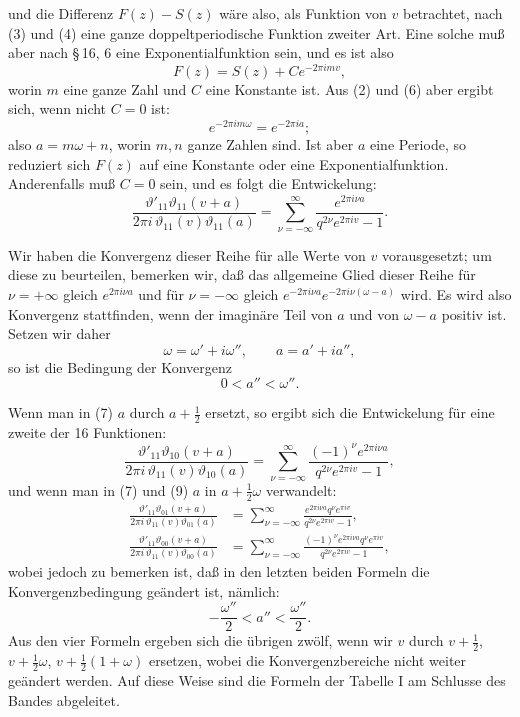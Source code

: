\documentclass[11pt]{article}
\providecommand{\tht}{\vartheta}
\begin{document}
und die Differenz $F(z)-S(z)$ wäre also, als Funktion von $v$ betrachtet, nach (3) und (4) eine ganze doppeltperiodische Funktion zweiter Art. Eine solche muß aber nach \S\,16, 6 eine Exponentialfunktion sein, und es ist also
\[
F(z)=S(z)+Ce^{-2\pi imv},
\]
worin $m$ eine ganze Zahl und $C$ eine Konstante ist. Aus (2) und (6) aber ergibt sich, wenn nicht $C=0$ ist:
\[
e^{-2\pi im\omega}=e^{-2\pi ia};
\]
also $a=m\omega+n$, worin $m,n$ ganze Zahlen sind. Ist aber $a$ eine Periode, so reduziert sich $F(z)$ auf eine Konstante oder eine Exponentialfunktion. Anderenfalls muß $C=0$ sein, und es folgt die Entwickelung:
\begin{equation}
\frac{\tht'_{11}\tht_{11}(v+a)}{2\pi i\,\tht_{11}(v)\tht_{11}(a)}
=\sum_{\nu=-\infty}^{\infty}\frac{e^{2\pi i\nu a}}{q^{2\nu}e^{2\pi iv}-1}.
\tag{7}
\end{equation}

Wir haben die Konvergenz dieser Reihe für alle Werte von $v$ vorausgesetzt; um diese zu beurteilen, bemerken wir, daß das allgemeine Glied dieser Reihe für $\nu=+\infty$ gleich $e^{2\pi i\nu a}$ und für $\nu=-\infty$ gleich $e^{-2\pi i\nu a}e^{-2\pi i\nu(\omega-a)}$ wird. Es wird also Konvergenz stattfinden, wenn der imaginäre Teil von $a$ und von $\omega-a$ positiv ist. Setzen wir daher
\[
\omega=\omega'+i\omega'',\qquad a=a'+ia'',
\]
so ist die Bedingung der Konvergenz
\begin{equation}
0<a''<\omega''.
\tag{8}
\end{equation}

Wenn man in (7) $a$ durch $a+\frac12$ ersetzt, so ergibt sich die Entwickelung für eine zweite der 16 Funktionen:
\begin{equation}
\frac{\tht'_{11}\tht_{10}(v+a)}{2\pi i\,\tht_{11}(v)\tht_{10}(a)}
=\sum_{\nu=-\infty}^{\infty}\frac{(-1)^\nu e^{2\pi i\nu a}}{q^{2\nu}e^{2\pi iv}-1},
\tag{9}
\end{equation}
und wenn man in (7) und (9) $a$ in $a+\frac12\omega$ verwandelt:
\begin{align}
\frac{\tht'_{11}\tht_{01}(v+a)}{2\pi i\,\tht_{11}(v)\tht_{01}(a)}
&=\sum_{\nu=-\infty}^{\infty}\frac{e^{2\pi i\nu a}q^\nu e^{\pi iv}}{q^{2\nu}e^{2\pi iv}-1}, \tag{10}\\
\frac{\tht'_{11}\tht_{00}(v+a)}{2\pi i\,\tht_{11}(v)\tht_{00}(a)}
&=\sum_{\nu=-\infty}^{\infty}\frac{(-1)^\nu e^{2\pi i\nu a}q^\nu e^{\pi iv}}{q^{2\nu}e^{2\pi iv}-1}, \tag{11}
\end{align}
wobei jedoch zu bemerken ist, daß in den letzten beiden Formeln die Konvergenzbedingung geändert ist, nämlich:
\[
-\frac{\omega''}{2}<a''<\frac{\omega''}{2}.
\]
Aus den vier Formeln ergeben sich die übrigen zwölf, wenn wir $v$ durch $v+\frac12$, $v+\frac12\omega$, $v+\frac12(1+\omega)$ ersetzen, wobei die Konvergenzbereiche nicht weiter geändert werden. Auf diese Weise sind die Formeln der Tabelle I am Schlusse des Bandes abgeleitet.
\end{document}
